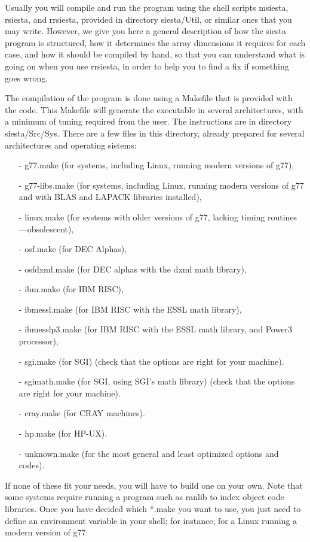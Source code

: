 Usually you will compile and run the program using the
shell scripts msiesta, rsiesta, and rrsiesta, provided in
directory siesta/Util, or similar ones that you may write.
However, we give you here a general description of how
the siesta program is structured, how it determines the
array dimensions it requires for each case, and how it
should be compiled by hand, so that you can understand
what is going on when you use rrsiesta, in order to help
you to find a fix if something goes wrong.

The compilation of the program is done using a Makefile
that is provided with the code.
This Makefile will generate the executable in several
architectures, with a  minimum of tuning required from the
user. The instructions are in directory siesta/Src/Sys.
There are a few files  in this directory,
already prepared for several architectures and
operating sistems: 
\begin{itemize}
\item[-] g77.make (for systems, including Linux, running modern
versions of g77),
\item[-] g77-libs.make (for systems, including Linux, running modern
versions of g77 and with BLAS and LAPACK libraries installed),
\item[-] linux.make (for systems with older versions of g77, lacking
timing routines ---obsolescent),
\item[-] osf.make (for DEC Alphas), 
\item[-] osfdxml.make (for DEC alphas with the dxml math library), 
\item[-] ibm.make (for IBM RISC), 
\item[-] ibmessl.make (for IBM RISC with the ESSL math library), 
\item[-] ibmesslp3.make (for IBM RISC with the ESSL math library, and
Power3 processor),
\item[-] sgi.make (for SGI) 
      (check that the options are right for your machine).
\item[-] sgimath.make (for SGI, using SGI's math library) 
      (check that the options are right for your machine).
\item[-] cray.make (for CRAY machines).
\item[-] hp.make (for HP-UX).
\item[-] unknown.make (for the most general and least optimized 
options and codes).
\end{itemize}
\noindent
If none of these fit your needs, you will have to build
one on your own. Note that some systems require running a program such as
ranlib to index object code libraries.
Once you have decided which *.make you want to use,
you just need to define an environment variable
in your shell; for instance, for a Linux running a modern version of
g77:


